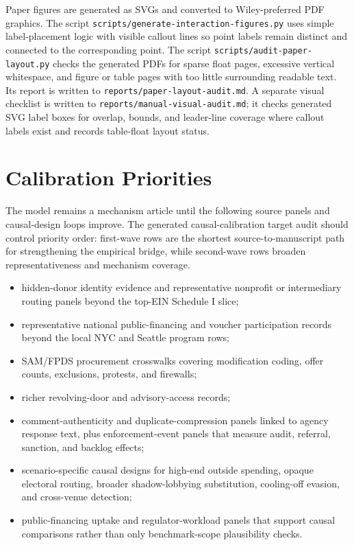 Paper figures are generated as SVGs and converted to Wiley-preferred PDF graphics. The script \texttt{scripts/generate-interaction-figures.py} uses simple label-placement logic with visible callout lines so point labels remain distinct and connected to the corresponding point. The script \texttt{scripts/audit-paper-layout.py} checks the generated PDFs for sparse float pages, excessive vertical whitespace, and figure or table pages with too little surrounding readable text. Its report is written to \texttt{reports/paper-layout-audit.md}. A separate visual checklist is written to \texttt{reports/manual-visual-audit.md}; it checks generated SVG label boxes for overlap, bounds, and leader-line coverage where callout labels exist and records table-float layout status.

\section{Calibration Priorities}

The model remains a mechanism article until the following source panels and causal-design loops improve. The generated causal-calibration target audit should control priority order: first-wave rows are the shortest source-to-manuscript path for strengthening the empirical bridge, while second-wave rows broaden representativeness and mechanism coverage.

\begin{itemize}
  \item hidden-donor identity evidence and representative nonprofit or intermediary routing panels beyond the top-EIN Schedule I slice;
  \item representative national public-financing and voucher participation records beyond the local NYC and Seattle program rows;
  \item SAM/FPDS procurement crosswalks covering modification coding, offer counts, exclusions, protests, and firewalls;
  \item richer revolving-door and advisory-access records;
  \item comment-authenticity and duplicate-compression panels linked to agency response text, plus enforcement-event panels that measure audit, referral, sanction, and backlog effects;
  \item scenario-specific causal designs for high-end outside spending, opaque electoral routing, broader shadow-lobbying substitution, cooling-off evasion, and cross-venue detection;
  \item public-financing uptake and regulator-workload panels that support causal comparisons rather than only benchmark-scope plausibility checks.
\end{itemize}

